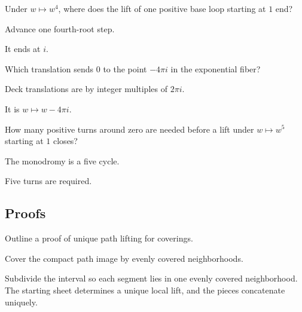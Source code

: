 \begin{exercise}\label{exr:iv23-expand-03}
Under \(w\mapsto w^4\), where does the lift of one positive base loop starting at \(1\) end?
\end{exercise}
\begin{hint}
Advance one fourth-root step.
\end{hint}
\begin{solution}
It ends at \(i\).
\end{solution}

\begin{exercise}\label{exr:iv23-expand-04}
Which translation sends \(0\) to the point \(-4\pi i\) in the exponential fiber?
\end{exercise}
\begin{hint}
Deck translations are by integer multiples of \(2\pi i\).
\end{hint}
\begin{solution}
It is \(w\mapsto w-4\pi i\).
\end{solution}

\begin{exercise}\label{exr:iv23-expand-05}
How many positive turns around zero are needed before a lift under \(w\mapsto w^5\) starting at \(1\) closes?
\end{exercise}
\begin{hint}
The monodromy is a five cycle.
\end{hint}
\begin{solution}
Five turns are required.
\end{solution}

\subsection*{Proofs}

\begin{exercise}\label{exr:iv23-expand-06}
Outline a proof of unique path lifting for coverings.
\end{exercise}
\begin{hint}
Cover the compact path image by evenly covered neighborhoods.
\end{hint}
\begin{solution}
Subdivide the interval so each segment lies in one evenly covered neighborhood. The starting sheet determines a unique local lift, and the pieces concatenate uniquely.
\end{solution}

